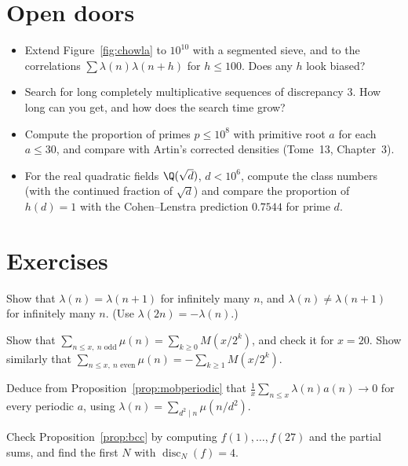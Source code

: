 \section{Open doors}

\begin{itemize}
\item Extend Figure~\ref{fig:chowla} to $10^{10}$ with a segmented sieve, and to the correlations $\sum\lambda(n)\lambda(n+h)$ for $h\le100$. Does any $h$
look biased?
\item Search for long completely multiplicative sequences of discrepancy $3$. How long can you get, and how does the search time grow?
\item Compute the proportion of primes $p\le10^8$ with primitive root $a$ for each $a\le30$, and compare with Artin's corrected densities (Tome~13, Chapter~3).
\item For the real quadratic fields $\Q(\sqrt d)$, $d<10^6$, compute the class numbers (with the continued fraction of $\sqrt d$) and compare the proportion
of $h(d)=1$ with the Cohen--Lenstra prediction $0.7544$ for prime $d$.
\end{itemize}

\section{Exercises}

\begin{exercise}[$\star$]\label{ex:signflip}
Show that $\lambda(n)=\lambda(n+1)$ for infinitely many $n$, and $\lambda(n)\ne\lambda(n+1)$ for infinitely many $n$. (Use $\lambda(2n)=-\lambda(n)$.)
\end{exercise}

\begin{exercise}[$\star$]\label{ex:oddmobius}
Show that $\sum_{n\le x,\ n\text{ odd}}\mu(n)=\sum_{k\ge0}M(x/2^k)$, and check it for $x=20$. Show similarly that $\sum_{n\le x,\ n\text{ even}}\mu(n)=-\sum_{k\ge1}M(x/2^k)$.
\end{exercise}

\begin{exercise}[$\star\star$]\label{ex:liouvilleperiodic}
Deduce from Proposition~\ref{prop:mobperiodic} that $\frac1x\sum_{n\le x}\lambda(n)a(n)\to0$ for every periodic $a$, using $\lambda(n)=\sum_{d^2\mid n}\mu(n/d^2)$.
\end{exercise}

\begin{exercise}[$\star$]\label{ex:edpcheck}
Check Proposition~\ref{prop:bcc} by computing $f(1),\dots,f(27)$ and the partial sums, and find the first $N$ with $\operatorname{disc}_N(f)=4$.
\end{exercise}

